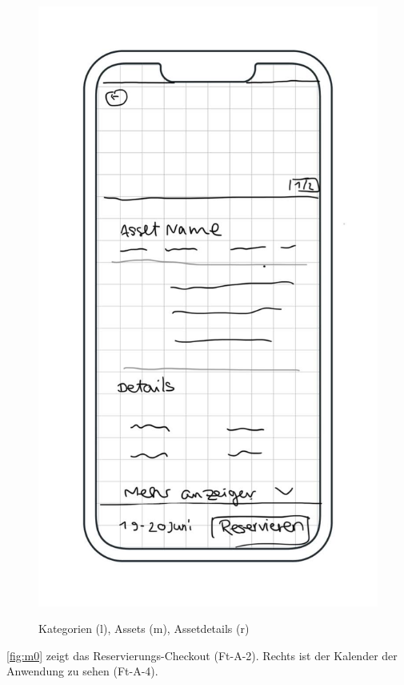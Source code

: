 \begin{figure}[h]
    \includegraphics[scale=0.37]{Bilder/Mockups/Details.jpg}
    \label{fig:m1}
    \caption[Mockup: Kategorien, Assets, Assetdetails]{Kategorien (l), Assets (m), Assetdetails (r)}
\end{figure}


\ref{fig:m0} zeigt das Reservierungs-Checkout (Ft-A-2). Rechts ist der Kalender der Anwendung
zu sehen (Ft-A-4). 

